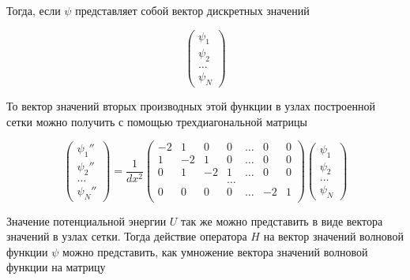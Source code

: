 \documentclass[a4paper, 12pt]{article}
\begin{document}
    Тогда, если $\psi$ представляет собой вектор дискретных значений    

    \begin{equation}
        \begin{pmatrix}
            \psi_1 \\
            \psi_2 \\
            \dots \\
            \psi_N
        \end{pmatrix}
    \end{equation}

    То вектор значений вторых производных этой функции в узлах построенной сетки можно получить с помощью
    трехдиагональной матрицы

    \begin{equation}
        \begin{pmatrix}
            \psi_1'' \\
            \psi_2'' \\
            \dots \\
            \psi_N''
            \end{pmatrix}
            = \frac{1}{dx^2}
            \begin{pmatrix}
            -2 &  1 & 0 & 0     & \dots & 0 & 0 \\
            1  & -2 & 1 & 0     & \dots & 0 & 0 \\
            0  & 1  &-2 & 1     & \dots & 0 & 0 \\
               &    &   & \dots &       &   &   \\
            0  & 0  & 0 & 0     & \dots &-2 & 1 \\
            \end{pmatrix}
            \begin{pmatrix}
            \psi_1 \\
            \psi_2 \\
            \dots \\
            \psi_N
        \end{pmatrix}
    \end{equation}

    Значение потенциальной энергии $U$ так же можно представить в виде вектора значений в узлах сетки. Тогда
    действие оператора $H$ на вектор значений волновой функции $\psi$ можно представить, как умножение вектора 
    значений волновой функции на матрицу
\end{document}
